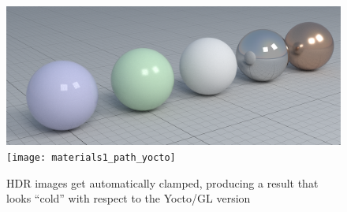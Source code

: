 \documentclass[12pt]{report}
\begin{document}
    \begin{figure}[h]
        \caption{HDR images get automatically clamped, producing a result that looks ``cold'' with respect to the Yocto/GL version}
        \includegraphics[width=\textwidth]{materials1_path}
        \texttt{[image: materials1\_path\_yocto]}
        \centering
        \label{fig:materials1_yocto}
    \end{figure}
\end{document}
